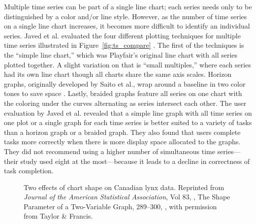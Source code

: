 Multiple time series can be part of a single line chart; each series needs only to be distinguished by a color and/or line style.  However, as the number of time series on a single line chart increases, it becomes more difficult to identify an individual series.  Javed et al. evaluated the four different plotting techniques for multiple time series illustrated in Figure~\ref{fig:ts_compare} \citeyearpar{javed2010}.  The first of the techniques is the ``simple line chart,'' which was Playfair's original line chart with all series plotted together.  A slight variation on that is ``small multiples,'' where each series had its own line chart though all charts share the same axis scales.  Horizon graphs, originally developed by Saito et al., wrap around a baseline in two color tones to save space \citeyearpar{saitoTwoTone}.  Lastly, braided graphs feature all series on one chart with the coloring under the curves alternating as series intersect each other.  The user evaluation by Javed et al. revealed that a simple line graph with all time series on one plot or a single graph for each time series is better suited to a variety of tasks than a horizon graph or a braided graph.  They also found that users complete tasks more correctly when there is more display space allocated to the graphs.  They did not recommend using a higher number of simultaneous time series---their study used eight at the most---because it leads to a decline in correctness of task completion.

\begin{figure}
	\centering
	\caption[Two effects of chart shape on Canadian lynx data]{Two effects of chart shape on Canadian lynx data.  Reprinted from \textit{Journal of the American Statistical Association}, Vol 83, \citeauthor{cleveland1988}, The Shape Parameter of a Two-Variable Graph, 289--300, \textcopyright \citeyear{cleveland1988}, with permission from Taylor \& Francis.}
	\label{fig:ratio}
\end{figure}

